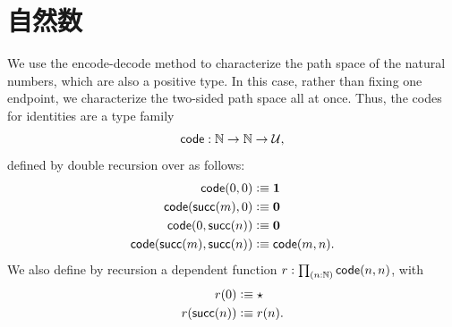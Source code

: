 \section{自然数}
\label{sec:compute-nat}

%
%
We use the encode-decode method to characterize the path space of the natural numbers, which are also a positive type.
In this case, rather than fixing one endpoint, we characterize the two-sided path space all at once.
Thus, the codes for identities are a type family
\[\mathsf{code}:\mathbb{N}\to\mathbb{N}\to\mathcal{U},\]
defined by double recursion over \N as follows:
\begin{align*}
  \mathsf{code}(0,0) &\vcentcolon\equiv \mathbf{1}\\
  \mathsf{code}(\mathsf{succ}(m),0) &\vcentcolon\equiv \mathbf{0}\\
  \mathsf{code}(0,\mathsf{succ}(n)) &\vcentcolon\equiv \mathbf{0}\\
  \mathsf{code}(\mathsf{succ}(m),\mathsf{succ}(n)) &\vcentcolon\equiv \mathsf{code}(m,n).
\end{align*}
We also define by recursion a dependent function $r:\prd{n:\N} \code(n,n)$, with
\begin{align*}
  r(0) &\vcentcolon\equiv \star\\
  r(\mathsf{succ}(n)) &\vcentcolon\equiv r(n).
\end{align*}

